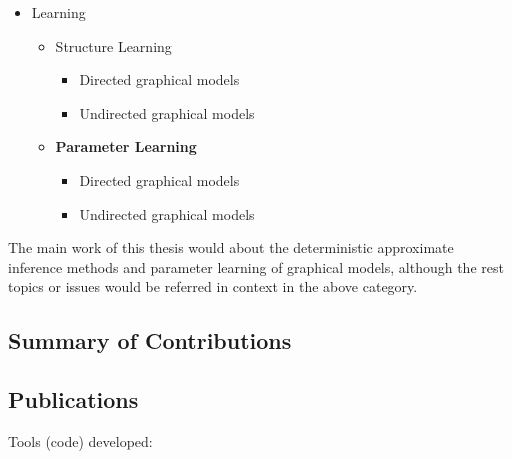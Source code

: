 \begin{itemize}
\item Learning
  \begin{itemize}
  \item Structure Learning
    \begin{itemize}
    \item Directed graphical models
    \item Undirected graphical models
    \end{itemize}
    
  \item \textbf{Parameter Learning}
    \begin{itemize}
    \item Directed graphical models
    \item Undirected graphical models
    \end{itemize}
  \end{itemize}
\end{itemize}

The main work of this thesis would about the deterministic approximate inference methods and parameter learning of graphical models, although the rest topics or issues would be referred in  context in the above category.






\subsection{Summary of Contributions}
\cite{liu2019dominant}

\subsection{Publications}

Tools (code) developed:


